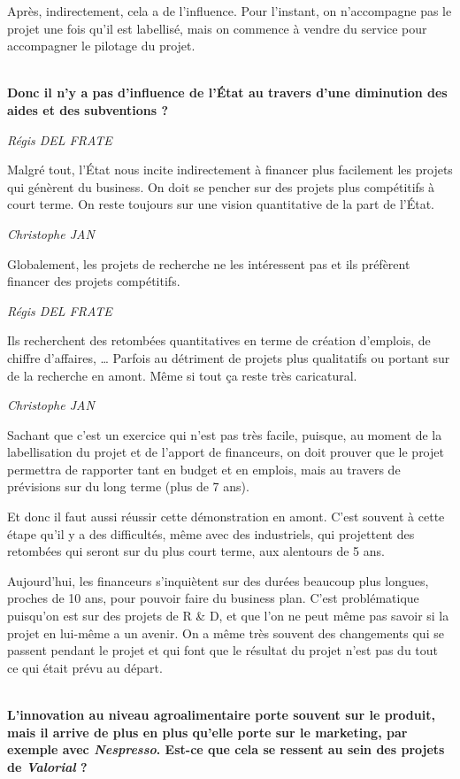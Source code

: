 \documentclass[a4paper,12pt]{report}
\begin{document}
    Après, indirectement, cela a de l’influence. Pour l’instant, on n’accompagne pas le projet une fois qu’il est labellisé, mais on commence à vendre du service pour accompagner le pilotage du projet. 

	\textbf{\\Donc il n’y a pas d’influence de l’État au travers d’une diminution des aides et des subventions ?}

	\emph{Régis DEL FRATE}
   
    Malgré tout, l’État nous incite indirectement à financer plus facilement les projets qui génèrent du business. On doit se pencher sur des projets plus compétitifs à court terme. On reste toujours sur une vision quantitative de la part de l’État.

	\emph{Christophe JAN}
	
    Globalement, les projets de recherche ne les intéressent pas et ils préfèrent financer des projets compétitifs. 

	\emph{Régis DEL FRATE}
   
    Ils recherchent des retombées quantitatives en terme de création d’emplois, de chiffre d’affaires, … Parfois au détriment de projets plus qualitatifs ou portant sur de la recherche en amont. Même si tout ça reste très caricatural.

	\emph{Christophe JAN}
	 
    Sachant que c’est un exercice qui n’est pas très facile, puisque, au moment de la labellisation du projet et de l’apport de financeurs, on doit prouver que le projet permettra de rapporter tant en budget et en emplois, mais au travers de prévisions sur du long terme (plus de 7 ans). 

	Et donc il faut aussi réussir cette démonstration en amont. C’est souvent à cette étape qu’il y a des difficultés, même avec des industriels, qui projettent des retombées qui seront sur du plus court terme, aux alentours de 5 ans. 

	Aujourd’hui, les financeurs s’inquiètent sur des durées beaucoup plus longues, proches de 10 ans, pour pouvoir faire du business plan. C’est problématique puisqu’on est sur des projets de R \& D, et que l’on ne peut même pas savoir si la projet en lui-même a un avenir.
    On a même très souvent des changements qui se passent pendant le projet et qui font que le résultat du projet n’est pas du tout ce qui était prévu au départ.

	\textbf{\\L’innovation au niveau agroalimentaire porte souvent sur le produit, mais il arrive de plus en plus qu’elle porte sur le marketing, par exemple avec \textit{Nespresso}. Est-ce que cela se ressent au sein des projets de \textit{Valorial} ?}
\end{document}
